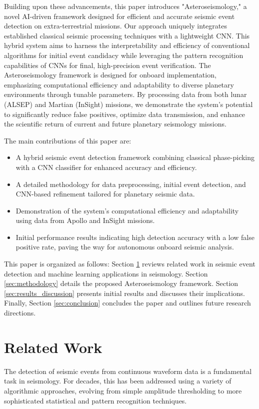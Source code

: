\documentclass[conference]{IEEEtran}
\begin{document}
Building upon these advancements, this paper introduces "Asteroseismology," a novel AI-driven framework
designed for efficient and accurate seismic event detection on extra-terrestrial missions. Our 
approach uniquely integrates established classical seismic processing techniques with a lightweight CNN. 
This hybrid system aims to harness the interpretability and efficiency of conventional algorithms for 
initial event candidacy while leveraging the pattern recognition capabilities of CNNs for final,
high-precision event verification. The Asteroseismology framework is designed for onboard implementation, 
emphasizing computational efficiency and adaptability to diverse planetary environments through 
tunable parameters. By processing data from both lunar (ALSEP) and Martian (InSight) missions, we 
demonstrate the system's potential to significantly reduce false positives, optimize data transmission, 
and enhance the scientific return of current and future planetary seismology missions.

The main contributions of this paper are:
\begin{itemize}
    \item A hybrid seismic event detection framework combining classical phase-picking with a CNN classifier for enhanced accuracy and efficiency.
    \item A detailed methodology for data preprocessing, initial event detection, and CNN-based refinement tailored for planetary seismic data.
    \item Demonstration of the system's computational efficiency and adaptability using data from Apollo and InSight missions.
    \item Initial performance results indicating high detection accuracy with a low false positive rate, paving the way for autonomous onboard seismic analysis.
\end{itemize}

This paper is organized as follows: Section \ref{sec:related_work} reviews related work in seismic event 
detection and machine learning applications in seismology. Section \ref{sec:methodology} details the 
proposed Asteroseismology framework. Section \ref{sec:results_discussion} presents initial results and 
discusses their implications. Finally, Section \ref{sec:conclusion} concludes the paper and outlines future
research directions.

\section{Related Work}
\label{sec:related_work}
The detection of seismic events from continuous waveform data is a fundamental task in seismology. For decades, this has been addressed using a variety of algorithmic approaches, evolving from simple amplitude thresholding to more sophisticated statistical and pattern recognition techniques.
\end{document}
